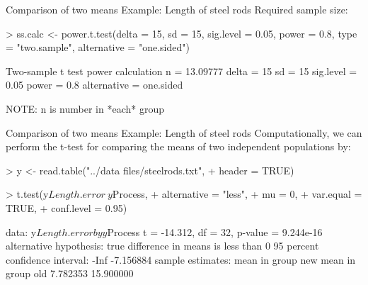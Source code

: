 \documentclass[t]{beamer}
\begin{document}


\begin{ftstf}
{Comparison of two means}
{Example: Length of steel rods}
Required sample size:
\begin{rcode}
> ss.calc <- power.t.test(delta       = 15,
                          sd          = 15,
                          sig.level   = 0.05,
                          power       = 0.8,
                          type        = "two.sample",
                          alternative = "one.sided")

Two-sample t test power calculation
n = 13.09777
delta = 15
sd = 15
sig.level = 0.05
power = 0.8
alternative = one.sided

NOTE: n is number in *each* group
\end{rcode}
\end{ftstf}


\begin{ftstf}
{Comparison of two means}
{Example: Length of steel rods}
Computationally, we can perform the t-test for comparing the means of two independent populations by:
\vhalf
\begin{rcode}
> y <- read.table("../data files/steelrods.txt",
+                 header = TRUE)

> t.test(y$Length.error ~ y$Process, 
+        alternative = "less", 
+        mu          = 0, 
+        var.equal   = TRUE, 
+        conf.level  = 0.95)

data:  y$Length.error by y$Process
t = -14.312, df = 32, p-value = 9.244e-16
alternative hypothesis: true difference in means is less than 0
95 percent confidence interval:
      -Inf -7.156884
sample estimates:
mean in group new mean in group old 
         7.782353         15.900000 
\end{rcode}
\end{ftstf}
\end{document}
